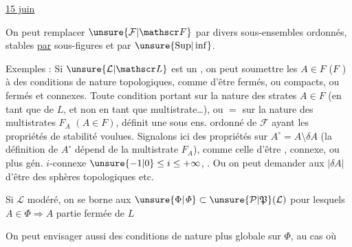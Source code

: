  \uline{15 juin}

On peut remplacer $\unsure{\mathcal F|\mathscr F}$ par divers  sous-ensembles ordonnés, stables \uline{par} \deleted{$\unsure{\in}$}  
sous-figures  et par $\unsure{\mathrm{Sup}|\inf}$.

Exemples : Si $\unsure{\mathcal L|\mathscr L}$ est un   , 
on peut soumettre les $A\in F$  ($F$ )
à des conditions de nature topologiques, comme d'être fermés, ou  compacts, ou fermés et connexes. Toute condition
portant sur la nature des strates $A\in F$ (en tant que  de $L$, et non en tant que multistrate\ldots), ou $=$ sur la nature des
multistrates $F_A$ $(A\in F)$, définit une sous ens. ordonné de $\mathcal F$ ayant les propriétés de stabilité voulues. Signalons ici
des propriétés  sur  $A^\circ=A\setminus\delta A$ (la définition de $A^\circ$ dépend de la multistrate $F_A$), comme celle d'être  ,
  connexe, ou plus gén. $i$-connexe $\unsure{-1|0}\leq i\leq+\infty$,  . Ou on peut demander aux $|\delta A|$
d'être des sphères topologiques etc.

Si $\mathcal L$   modéré, on se borne aux $\unsure{\Phi|\mathit{\Phi}}\subset\unsure{\mathcal P|\mathfrak P}(\mathcal L)$ pour lesquels $A\in\Phi\Longrightarrow A$ partie fermée \uline{} de $L$

On peut envisager aussi des conditions de nature plus globale sur $\Phi$, au cas où

